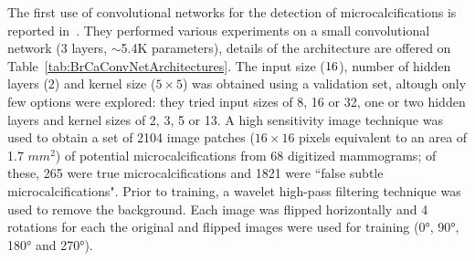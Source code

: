 \begin{comment} Lo1995
- detect microcalcifications
- only years after lecun showed it to be good on the mnist dataset.
- preselected images
- Background removal with wavelet high pass filtering ("a three-level wavelet transform was used and only the lowest frequency was eliminated for high-pass filtering before image reconstruction."). For lung nodules: Background removal like constrast enhancement.
- YES/NO output. For lung nodules: degrees of sensitivity in output(1-10) instead of disease/no disease . 
- Rotation and translation invariance. 0,90,180,270 and flipped over. (all of this on the small 32 by 32 images). No use of translation, it talks about it, though.
- Uses ROC/AUC.
- Each pixel represented 0.105 mm. (for instance 16 pixel input was 1.7mm)
- Same set used for validation and test
- using the data augmented versions one after the other in training gives better performance here (not sure why)
- 30-fold crossvalidation results reported (no test set): 0.89 AUC for individual miscrocalcifications and 0.97 for clustered microcalcif. 
- not quite clear if label were beningn/malign, microcalc/non-microcalc. It hink it is detection not diagonsis
- not clear how they measure the detection of microcalc. I think, of those microcalc detected from the normal algorithm if more than 3 were in the same 1 cm^2 area, it was considered as if the convnet detcted a cluster. 
- Easier to detect clusters these way because there could be 20 micorcalcif in a 1 cm^2 area and it only needs to detect 3.
- Bunch of questions on how on hell is this done. It could be done in a way that would help a lot the results, maybe that is why they have 0.97 AUC
\end{comment}
The first use of convolutional networks for the detection of microcalcifications is reported in~\cite{Lo1995}. They performed various experiments on a small convolutional network (3 layers, $\sim$5.4K parameters), details of the architecture are offered on Table~\ref{tab:BrCaConvNetArchitectures}. The input size ($16\time16$), number of hidden layers ($2$) and kernel size ($5\times5$) was obtained using a validation set, altough only few options were explored: they tried input sizes of 8, 16 or 32, one or two hidden layers and kernel sizes of 2, 3, 5 or 13.
A high sensitivity image technique was used to obtain a set of 2104 image patches ($16 \times 16$ pixels equivalent to an area of 1.7 $mm^2$) of potential microcalcifications from 68 digitized mammograms; of these, 265 were true microcalcifications and 1821 were ``false subtle microcalcifications". Prior to training, a wavelet high-pass filtering technique was used to remove the background. Each image was flipped horizontally and 4 rotations for each the original and flipped images were used for training (0°, 90°, 180° and 270°).
